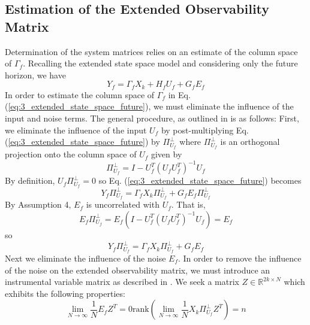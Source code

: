 \subsection{Estimation of the Extended Observability Matrix}\label{sec:estimation_of_the_extended_observability_matrix}
Determination of the system matrices relies on an estimate of the column space of $\Gamma_f$. Recalling the extended state space model and considering only the future horizon, we have
\begin{equation}\label{eq:3_extended_state_space_future}
Y_f = \Gamma_f X_k + H_f U_f + G_f E_f
\end{equation}
In order to estimate the column space of $\Gamma_f$ in Eq. (\ref{eq:3_extended_state_space_future}), we must eliminate the influence of the input and noise terms. The general procedure, as outlined in \cite{qin2006overview, verhaegen2007filtering} is as follows: First, we eliminate the influence of the input $U_f$ by post-multiplying Eq. (\ref{eq:3_extended_state_space_future}) by $\Pi_{U_f}^\perp$ where $\Pi_{U_f}^\perp$ is an orthogonal projection onto the column space of $U_f$ given by
\begin{equation*}
\Pi_{U_f}^\perp = I - U_f^T(U_f U_f^T)^{-1}U_f
\end{equation*}
By definition, $U_f\Pi_{U_f}^\perp = 0$ so Eq. (\ref{eq:3_extended_state_space_future}) becomes
\begin{equation}
Y_f\Pi_{U_f}^\perp = \Gamma_f X_k\Pi_{U_f}^\perp + G_f E_f\Pi_{U_f}^\perp
\end{equation}
By Assumption 4, $E_f$ is uncorrelated with $U_f$. That is,
\begin{equation*}
E_f \Pi_{U_f}^\perp = E_f(I-U_f^T(U_fU_f^T)^{-1}U_f) = E_f
\end{equation*}
so
\begin{equation}\label{eq:3_extended_state_space_noinput}
Y_f\Pi_{U_f}^\perp = \Gamma_f X_k\Pi_{U_f}^\perp + G_f E_f
\end{equation}
Next we eliminate the influence of the noise $E_f$. In order to remove the influence of the noise on the extended observability matrix, we must introduce an instrumental variable matrix as described in \cite{verhaegen2007filtering}. We seek a matrix $Z \in \mathbb{R}^{2k\times N}$ which exhibits the following properties:
\begin{subequations}\begin{equation}\label{eq:3_instrumental_a}
\lim_{N\rightarrow\infty} \frac{1}{N} E_f Z^T = 0
\end{equation}
\begin{equation}\label{eq:3_instrumental_b}
\mbox{rank}\left(\lim_{N\rightarrow\infty} \frac{1}{N} X_k \Pi_{U_f}^\perp Z^T\right) = n
\end{equation}
\end{subequations}
